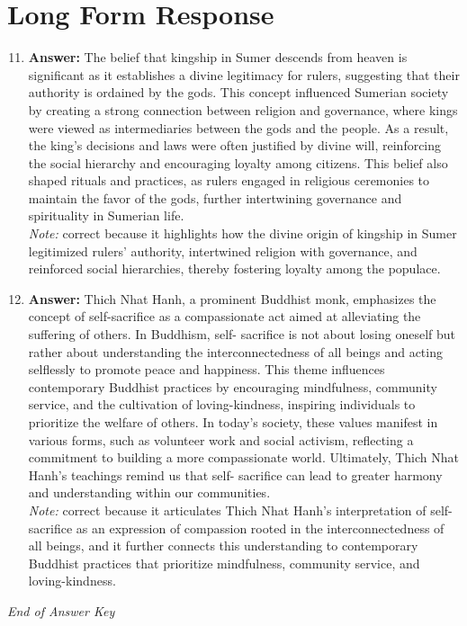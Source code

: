 \documentclass[12pt]{article}
\begin{document}
\section*{Long Form Response}
\begin{enumerate}[label=\arabic*.]
\setcounter{enumi}{10}
\item \textbf{Answer:} The belief that kingship in Sumer descends from heaven is significant as it establishes a divine legitimacy for rulers, suggesting that their authority is ordained by the gods. This concept influenced Sumerian society by creating a strong connection between religion and governance, where kings were viewed as intermediaries between the gods and the people. As a result, the king's decisions and laws were often justified by divine will, reinforcing the social hierarchy and encouraging loyalty among citizens. This belief also shaped rituals and practices, as rulers engaged in religious ceremonies to maintain the favor of the gods, further intertwining governance and spirituality in Sumerian life.
\\ \textit{Note:} correct because it highlights how the divine origin of kingship in Sumer legitimized rulers' authority, intertwined religion with governance, and reinforced social hierarchies, thereby fostering loyalty among the populace.
\item \textbf{Answer:} Thich Nhat Hanh, a prominent Buddhist monk, emphasizes the concept of self-sacrifice as a compassionate act aimed at alleviating the suffering of others. In Buddhism, self- sacrifice is not about losing oneself but rather about understanding the interconnectedness of all beings and acting selflessly to promote peace and happiness. This theme influences contemporary Buddhist practices by encouraging mindfulness, community service, and the cultivation of loving-kindness, inspiring individuals to prioritize the welfare of others. In today's society, these values manifest in various forms, such as volunteer work and social activism, reflecting a commitment to building a more compassionate world. Ultimately, Thich Nhat Hanh's teachings remind us that self- sacrifice can lead to greater harmony and understanding within our communities.
\\ \textit{Note:} correct because it articulates Thich Nhat Hanh's interpretation of self-sacrifice as an expression of compassion rooted in the interconnectedness of all beings, and it further connects this understanding to contemporary Buddhist practices that prioritize mindfulness, community service, and loving-kindness.
\end{enumerate}

\vfill
\noindent\textit{End of Answer Key}
\end{document}
